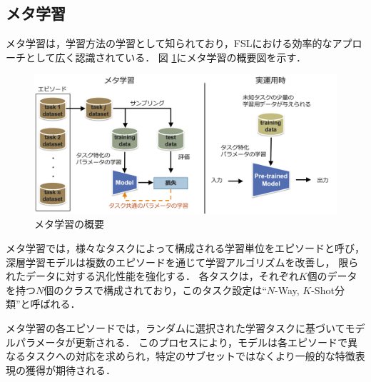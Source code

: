 \subsection{メタ学習}

メタ学習は，学習方法の学習として知られており，FSLにおける効率的なアプローチとして広く認識されている．
図 \ref{fig:meta-learning}にメタ学習の概要図を示す．
% 
\begin{figure}[tbp]
  \centering
  \includegraphics[width=\linewidth, keepaspectratio]{image/meta-learning.png}
  \caption{メタ学習の概要}
  \label{fig:meta-learning}
\end{figure}
% 
メタ学習では，様々なタスクによって構成される学習単位をエピソードと呼び，深層学習モデルは複数のエピソードを通じて学習アルゴリズムを改善し，
限られたデータに対する汎化性能を強化する．
各タスクは，それぞれ$K$個のデータを持つ$N$個のクラスで構成されており，このタスク設定は``$N$-Way, $K$-Shot分類''と呼ばれる．

メタ学習の各エピソードでは，ランダムに選択された学習タスクに基づいてモデルパラメータが更新される．
このプロセスにより，モデルは各エピソードで異なるタスクへの対応を求められ，特定のサブセットではなくより一般的な特徴表現の獲得が期待される．

